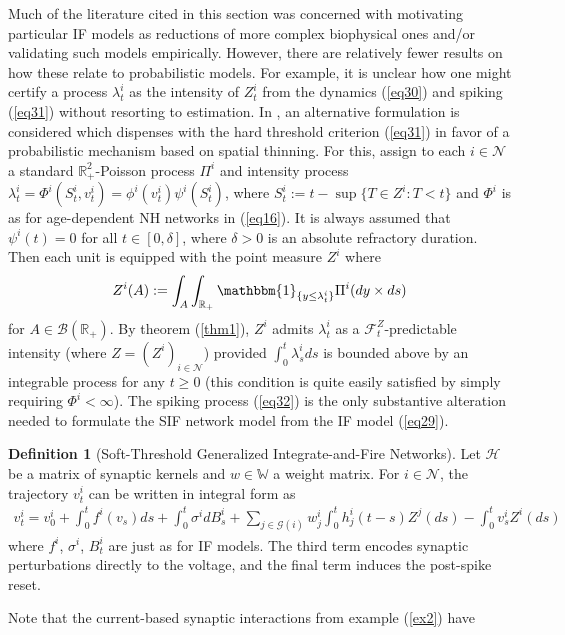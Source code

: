 \documentclass[12pt, oneside]{report}
\newcommand{\mbb}[1]{\mathbb{#1}}
\newcommand{\1}[1]{\mathbbm{1}_{\{#1\}}}
\newcommand{\mc}[1]{\mathcal{#1}}
\theoremstyle{definition}
\newtheorem{definition}[theorem]{Definition}
\begin{document}
Much of the literature cited in this section was concerned with motivating
particular IF models as reductions of more complex biophysical ones and/or
validating such models empirically. However, there are relatively fewer results on
how these relate to probabilistic models. For example, it is unclear how
one might certify a process $\lambda^i_t$ as the intensity of $Z^i_t$ from the
dynamics (\ref{eq30}) and spiking (\ref{eq31}) without resorting to estimation.
In \cite{Jabin_Zhou_2023}, an alternative formulation is considered which
dispenses with the hard threshold criterion (\ref{eq31}) in favor of a
probabilistic mechanism based on spatial thinning. For this, assign to each $i\in\mc{N}$ a
standard $\mbb{R}^2_+$-Poisson process $\Pi^i$ and intensity process
$\lambda^i_t=\Phi^i(S^i_t,v^i_t)=\phi^i(v^i_t)\psi^i(S^i_t)$, where
$S^i_t:=t-\sup\{T\in Z^i:T<t\}$ and $\Phi^i$ is as for age-dependent NH networks
in (\ref{eq16}). It is always assumed that $\psi^i(t)=0$ for all
$t\in[0,\delta]$, where $\delta>0$ is an absolute refractory duration. Then each
unit is equipped with the point measure $Z^i$ where
\begin{align}
    Z^i(A):=\int_A\int_{\mbb{R}_+}\1{y\leq \lambda^i_t}\Pi^i(dy\times ds)\label{eq32}
\end{align}
for $A\in\mc{B}(\mbb{R}_+)$. By
theorem (\ref{thm1}), $Z^i$ admits $\lambda^i_t$ as a $\mc{F}^{Z}_t$-predictable
intensity (where $Z=(Z^i)_{i\in\mc{N}}$) provided $\int_0^t\lambda^i_sds$ is
bounded above by an integrable process for any $t\geq 0$ (this condition is quite easily satisfied by
simply requiring $\Phi^i<\infty$). The spiking process (\ref{eq32}) is the only
substantive alteration needed to formulate the SIF network model from the IF
model (\ref{eq29}).
\begin{definition}[Soft-Threshold Generalized Integrate-and-Fire
    Networks]\label{def21} Let $\mc{H}$ be a matrix of synaptic kernels and
    $w\in\mbb{W}$ a weight matrix. For $i\in\mc{N}$, the trajectory $v^i_t$ can
    be written in integral form as 
    \begin{align*}
        v^i_t=v^i_0+\int_0^tf^i(v_s)ds+\int_0^t\sigma^idB^i_s+\sum_{j\in\mc{G}(i)}w^i_j\int_0^th^i_j(t-s)Z^j(ds)-\int_0^tv^i_sZ^i(ds)
    \end{align*}
    where $f^i$, $\sigma^i$, $B^i_t$ are just as for IF models. The third term
    encodes synaptic perturbations directly to the voltage, and the final term
    induces the post-spike reset.
\end{definition}
Note that the current-based synaptic interactions from example (\ref{ex2}) have
\end{document}
